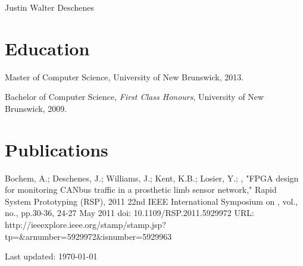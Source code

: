 \documentclass[10pt,letterpaper]{article}
\def\name{Justin Walter Deschenes}
\renewenvironment{itemize}{
  \begin{list}{}{
    \setlength{\leftmargin}{1.5em}
    \setlength{\itemsep}{0.25em}
    \setlength{\parskip}{0pt}
    \setlength{\parsep}{0.25em}
  }
}{
  \end{list}
}
\begin{document}
{\huge \name}


\bigskip

\section*{Education}

\begin{itemize}
  \item Master of Computer Science, 
    University of New Brunswick, 2013.
  \item Bachelor of Computer Science, \textit{First Class Honours},
    University of New Brunswick, 2009.
\end{itemize}

\section*{Publications}

Bochem, A.; Deschenes, J.; Williams, J.; Kent, K.B.; Losier, Y.; , "FPGA design for monitoring CANbus traffic in a prosthetic limb sensor network," Rapid System Prototyping (RSP), 2011 22nd IEEE International Symposium on , vol., no., pp.30-36, 24-27 May 2011
doi: 10.1109/RSP.2011.5929972
URL: http://ieeexplore.ieee.org/stamp/stamp.jsp?tp=&arnumber=5929972&isnumber=5929963

\medskip

\begin{center}
  \begin{small}
    Last updated: \today
  \end{small}
\end{center}
\end{document}
